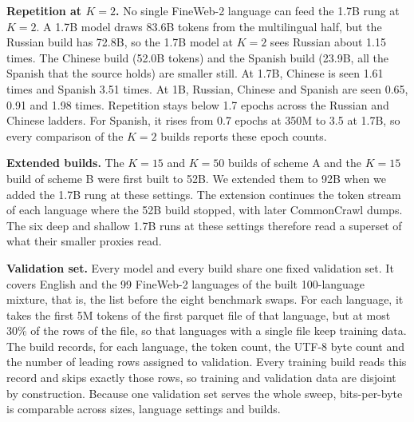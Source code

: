 \textbf{Repetition at $K=2$.} No single FineWeb-2 language can feed the 1.7B rung at $K=2$. A 1.7B model draws 83.6B tokens from the multilingual half, but the Russian build has 72.8B, so the 1.7B model at $K=2$ sees Russian about 1.15 times. The Chinese build (52.0B tokens) and the Spanish build (23.9B, all the Spanish that the source holds) are smaller still. At 1.7B, Chinese is seen 1.61 times and Spanish 3.51 times. At 1B, Russian, Chinese and Spanish are seen 0.65, 0.91 and 1.98 times. Repetition stays below 1.7 epochs across the Russian and Chinese ladders. For Spanish, it rises from 0.7 epochs at 350M to 3.5 at 1.7B, so every comparison of the $K=2$ builds reports these epoch counts.

\textbf{Extended builds.} The $K=15$ and $K=50$ builds of scheme A and the $K=15$ build of scheme B were first built to 52B. We extended them to 92B when we added the 1.7B rung at these settings. The extension continues the token stream of each language where the 52B build stopped, with later CommonCrawl dumps. The six deep and shallow 1.7B runs at these settings therefore read a superset of what their smaller proxies read. %

\textbf{Validation set.} Every model and every build share one fixed validation set. It covers English and the 99 FineWeb-2 languages of the built 100-language mixture, that is, the list before the eight benchmark swaps. For each language, it takes the first 5M tokens of the first parquet file of that language, but at most 30\% of the rows of the file, so that languages with a single file keep training data. The build records, for each language, the token count, the UTF-8 byte count and the number of leading rows assigned to validation. Every training build reads this record and skips exactly those rows, so training and validation data are disjoint by construction. Because one validation set serves the whole sweep, bits-per-byte is comparable across sizes, language settings and builds.
